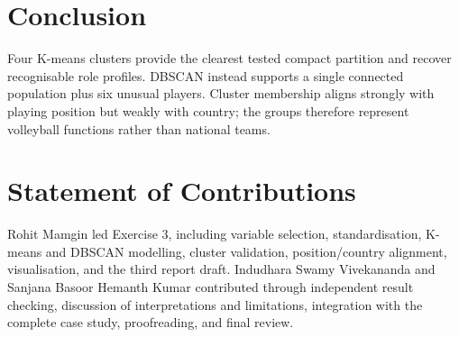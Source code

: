 \documentclass{MALEO_report}
\begin{document}
\section{Conclusion}
Four K-means clusters provide the clearest tested compact partition and recover recognisable role profiles. DBSCAN instead supports a single connected population plus six unusual players. Cluster membership aligns strongly with playing position but weakly with country; the groups therefore represent volleyball functions rather than national teams.
\section*{Statement of Contributions}
Rohit Mamgin led Exercise 3, including variable selection, standardisation, K-means and DBSCAN modelling, cluster validation, position/country alignment, visualisation, and the third report draft. Indudhara Swamy Vivekananda and Sanjana Basoor Hemanth Kumar contributed through independent result checking, discussion of interpretations and limitations, integration with the complete case study, proofreading, and final review.
\end{document}
